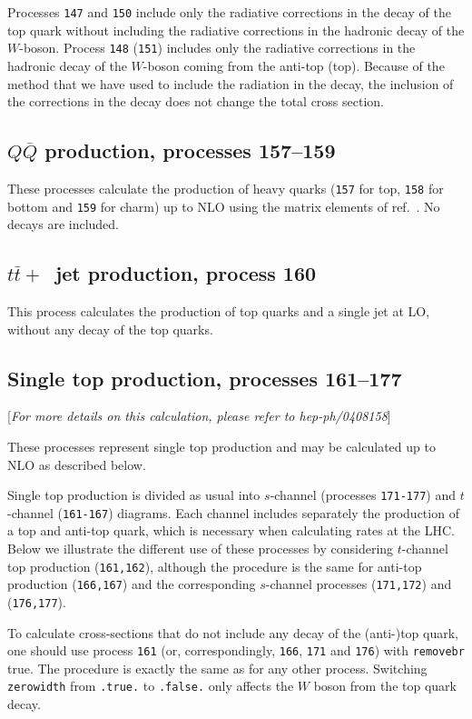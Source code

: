 \documentclass[12pt]{article}
\begin{document}
Processes {\tt 147} and {\tt 150} include only the radiative 
corrections in the decay of the top quark without including 
the radiative corrections in the hadronic decay of the $W$-boson.
Process {\tt 148} ({\tt 151}) includes only the radiative corrections
in the hadronic decay of the $W$-boson coming from the anti-top (top).
Because of the method that we have used to include the radiation in the decay,
the inclusion of the corrections in the decay does not change the
total cross section.

\subsection{$Q\overline{Q}$ production, processes 157--159}
These processes calculate the production of heavy quarks
({\tt 157} for top, {\tt 158} for bottom and {\tt 159} for charm) up to NLO 
using the matrix elements of ref.~\cite{Nason:1987xz}. No decays
are included.

\subsection{$t{\bar t}+$~jet production, process 160}
This process calculates the production of top quarks and a single jet
at LO, without any decay of the top quarks.

\subsection{Single top production, processes 161--177}
\label{subsec:stop}

\begin{center}
[{\it For more details on this calculation, please refer to hep-ph/0408158}]
\end{center}

These processes represent single top production and may be calculated up to
NLO as described below.

Single top production is divided as usual into $s$-channel 
(processes {\tt 171-177}) and $t$-channel ({\tt 161-167})
diagrams. Each channel includes separately the production of a top
and anti-top quark, which is necessary when calculating rates at the LHC.
Below we illustrate the different use of these processes by considering
$t$-channel top production ({\tt 161,162}), although the procedure is the same
for anti-top production ({\tt 166,167}) and the corresponding $s$-channel
processes ({\tt 171,172}) and ({\tt 176,177}).

To calculate cross-sections that do not include any decay of the (anti-)top
quark, one should use process {\tt 161}
(or, correspondingly, {\tt 166}, {\tt 171} and {\tt 176}) with {\tt removebr}
true. The procedure is exactly the same
as for any other process.
Switching {\tt zerowidth} from {\tt .true.} to {\tt .false.} only affects
the $W$ boson from the top quark decay.
\end{document}
